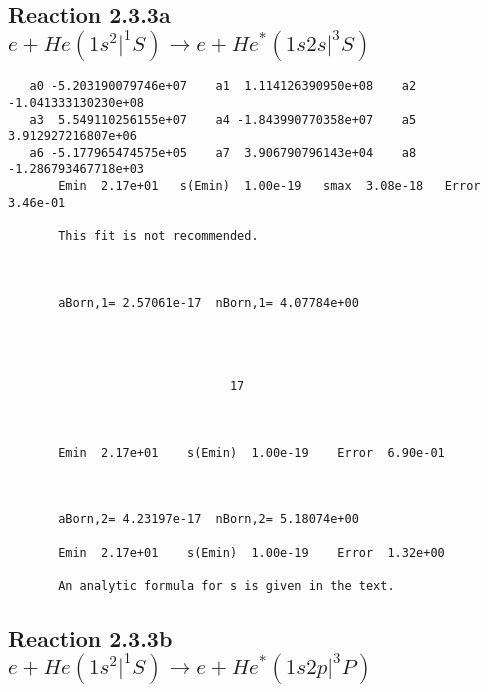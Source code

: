 \documentclass[12pt]{article}
\begin{document}
\newpage
\subsection{
Reaction 2.3.3a $e + He(1s^2|^1S) \rightarrow e + He^*(1s2s|^3S)$}

















\begin{small}\begin{verbatim}
   a0 -5.203190079746e+07    a1  1.114126390950e+08    a2 -1.041333130230e+08
   a3  5.549110256155e+07    a4 -1.843990770358e+07    a5  3.912927216807e+06
   a6 -5.177965474575e+05    a7  3.906790796143e+04    a8 -1.286793467718e+03
       Emin  2.17e+01   s(Emin)  1.00e-19   smax  3.08e-18   Error  3.46e-01

       This fit is not recommended.



       aBorn,1= 2.57061e-17  nBorn,1= 4.07784e+00




                               17



       Emin  2.17e+01    s(Emin)  1.00e-19    Error  6.90e-01



       aBorn,2= 4.23197e-17  nBorn,2= 5.18074e+00

       Emin  2.17e+01    s(Emin)  1.00e-19    Error  1.32e+00

       An analytic formula for s is given in the text.
\end{verbatim}\end{small}




\newpage
\subsection{
Reaction 2.3.3b $e + He(1s^2|^1S) \rightarrow e + He^*(1s2p|^3P)$}






\end{document}
